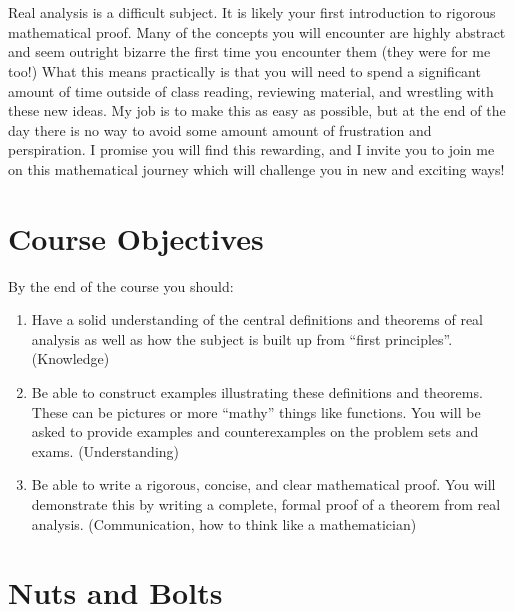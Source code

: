 \documentclass[11pt]{article}
\begin{document}
\\\\
Real analysis is a difficult subject. It is likely your first introduction to rigorous mathematical proof. Many of the concepts you will encounter are highly abstract and seem outright bizarre the first time you encounter them (they were for me too!) What this means practically is that you will need to spend a significant amount of time outside of class reading, reviewing material, and wrestling with these new ideas. My job is to make this as easy as possible, but at the end of the day there is no way to avoid some amount amount of frustration and perspiration. I promise you will find this rewarding, and I invite you to join me on this mathematical journey which will challenge you in new and exciting ways!

\section*{Course Objectives}
By the end of the course you should:
\begin{enumerate}
\item Have a solid understanding of the central definitions and theorems of real analysis as well as how the subject is built up from ``first principles''. (Knowledge)
\item Be able to construct examples illustrating these definitions and theorems. These can be pictures or more ``mathy'' things like functions. You will be asked to provide examples and counterexamples on the problem sets and exams. (Understanding)
\item Be able to write a rigorous, concise, and clear mathematical proof. You will demonstrate this by writing a complete, formal proof of a theorem from real analysis. (Communication, how to think like a mathematician)
\end{enumerate}

\section*{Nuts and Bolts}
\end{document}
